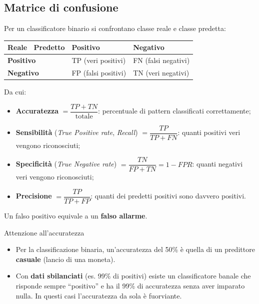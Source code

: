 \subsection{Matrice di confusione}\label{matrice-di-confusione}

Per un classificatore binario si confrontano classe reale e classe
predetta:

{\def\LTcaptype{none} %
\begin{longtable}[]{@{}lll@{}}
\toprule\noalign{}
Reale ~Predetto & Positivo & Negativo \\
\midrule\noalign{}
\endhead
\bottomrule\noalign{}
\endlastfoot
\textbf{Positivo} & TP (veri positivi) & FN (falsi negativi) \\
\textbf{Negativo} & FP (falsi positivi) & TN (veri negativi) \\
\end{longtable}
}

Da cui:

\begin{itemize}
\tightlist
\item
  \textbf{Accuratezza} \(= \dfrac{TP + TN}{\text{totale}}\): percentuale
  di pattern classificati correttamente;
\item
  \textbf{Sensibilità} (\emph{True Positive rate}, \emph{Recall})
  \(= \dfrac{TP}{TP + FN}\): quanti positivi veri vengono riconosciuti;
\item
  \textbf{Specificità} (\emph{True Negative rate})
  \(= \dfrac{TN}{FP + TN} = 1 - FPR\): quanti negativi veri vengono
  riconosciuti;
\item
  \textbf{Precisione} \(= \dfrac{TP}{TP + FP}\): quanti dei predetti
  positivi sono davvero positivi.
\end{itemize}

Un falso positivo equivale a un \textbf{falso allarme}.

\begin{boxwarning}{Attenzione all'accuratezza}

\begin{itemize}
\tightlist
\item
  Per la classificazione binaria, un'accuratezza del 50\% è quella di un
  predittore \textbf{casuale} (lancio di una moneta).
\item
  Con \textbf{dati sbilanciati} (es. 99\% di positivi) esiste un
  classificatore banale che risponde sempre ``positivo'' e ha il 99\% di
  accuratezza senza aver imparato nulla. In questi casi l'accuratezza da
  sola è fuorviante.
\end{itemize}

\end{boxwarning}

